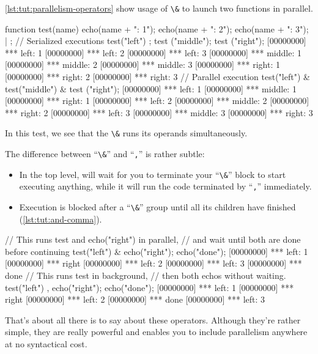 \autoref{lst:tut:parallelism-operators} show usage of \lstinline{\&} to launch two
functions in parallel.

\begin{urbiscript}[caption=Parallelism operator,
  label=lst:tut:parallelism-operators, name=parallel]
function test(name)
{
  echo(name + ": 1");
  echo(name + ": 2");
  echo(name + ": 3");
} | {};
// Serialized executions
test("left") ; test ("middle"); test ("right");
[00000000] *** left: 1
[00000000] *** left: 2
[00000000] *** left: 3
[00000000] *** middle: 1
[00000000] *** middle: 2
[00000000] *** middle: 3
[00000000] *** right: 1
[00000000] *** right: 2
[00000000] *** right: 3
// Parallel execution
test("left") & test("middle") & test ("right");
[00000000] *** left: 1
[00000000] *** middle: 1
[00000000] *** right: 1
[00000000] *** left: 2
[00000000] *** middle: 2
[00000000] *** right: 2
[00000000] *** left: 3
[00000000] *** middle: 3
[00000000] *** right: 3
\end{urbiscript}

In this test, we see that the \lstinline{\&} runs its operands
simultaneously.

The difference between ``\lstinline{\&}'' and ``\lstinline{,}'' is rather
subtle:

\begin{itemize}
\item In the top level, will wait for you to terminate your
  ``\lstinline{\&}'' block to start executing anything, while it will run
  the code terminated by ``\lstinline{,}'' immediately.
\item Execution is blocked after a ``\lstinline{\&}'' group until all its
  children have finished (\autoref{lst:tut:and-comma}).
\end{itemize}

\begin{urbiscript}[caption=Difference between ``\lstinline{\&}'' and
``\lstinline{,}'', label=lst:tut:and-comma, name=parallel]
// This runs test and echo("right") in parallel,
// and wait until both are done before continuing
test("left") & echo("right"); echo("done");
[00000000] *** left: 1
[00000000] *** right
[00000000] *** left: 2
[00000000] *** left: 3
[00000000] *** done
// This runs test in background,
// then both echos without waiting.
test("left") , echo("right"); echo("done");
[00000000] *** left: 1
[00000000] *** right
[00000000] *** left: 2
[00000000] *** done
[00000000] *** left: 3
\end{urbiscript}

That's about all there is to say about these operators. Although
they're rather simple, they are really powerful and enables you to
include parallelism anywhere at no syntactical cost.

